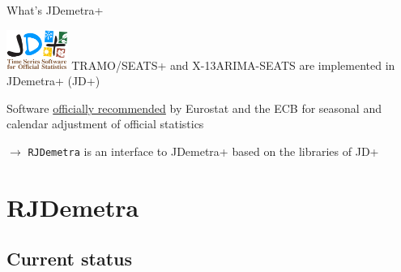 \documentclass[10pt,xcolor=table,color={dvipsnames,usenames},ignorenonframetext,usepdftitle=false,french]{beamer}
\begin{document}
\begin{frame}{What's JDemetra+\bcquestion }
\protect\hypertarget{whats-jdemetra}{}

\includegraphics[width=2cm]{img/jdemetra+.png} TRAMO/SEATS+ and
X-13ARIMA-SEATS are implemented in JDemetra+ (JD+)

\bigskip

\large\faThumbsUp{} \normalsize Software
\href{https://ec.europa.eu/eurostat/cros/system/files/Jdemetra_\%20release.pdf}{officially
recommended} by Eurostat and the ECB for seasonal and calendar
adjustment of official statistics

\bigskip

\(\rightarrow\) \texttt{RJDemetra} is an \large\faRProject{}
\normalsize interface to JDemetra+ based on the \large\faJava{}
\normalsize libraries of JD+

\end{frame}

\hypertarget{rjdemetra}{%
\section{RJDemetra}\label{rjdemetra}}

\hypertarget{current-status}{%
\subsection{Current status}\label{current-status}}
\end{document}
